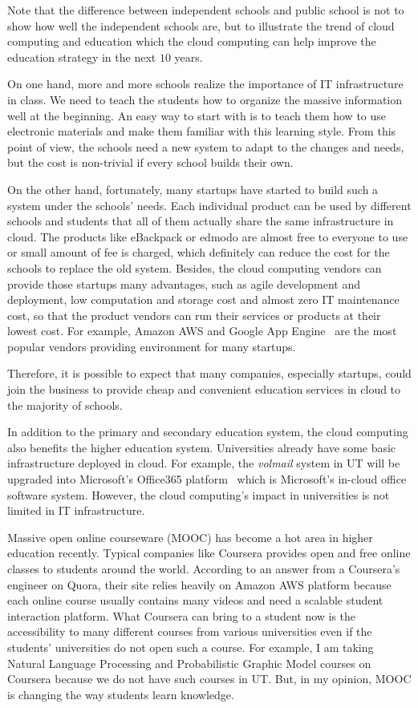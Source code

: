 Note that the difference between independent schools and public school is not to show how well the independent schools are, but to illustrate the trend of cloud computing and education which the cloud computing can help improve the education strategy in the next $10$ years.

On one hand, more and more schools realize the importance of IT infrastructure in class. We need to teach the students how to organize the massive information well at the beginning. An easy way to start with is to teach them how to use electronic materials and make them familiar with this learning style. From this point of view, the schools need a new system to adapt to the changes and needs, but the cost is non-trivial if every school builds their own. 

On the other hand, fortunately, many startups have started to build such a system under the schools' needs. Each individual product can be used by different schools and students that all of them actually share the same infrastructure in cloud. The products like eBackpack or edmodo are almost free to everyone to use or small amount of fee is charged, which definitely can reduce the cost for the schools to replace the old system. Besides, the cloud computing vendors can provide those startups many advantages, such as agile development and deployment, low computation and storage cost and almost zero IT maintenance cost, so that the product vendors can run their services or products at their lowest cost. For example, Amazon AWS and Google App Engine~\cite{gae} are the most popular vendors providing environment for many startups.

Therefore, it is possible to expect that many companies, especially startups, could join the business to provide cheap and convenient education services in cloud to the majority of schools.

In addition to the primary and secondary education system, the cloud computing also benefits the higher education system. Universities already have some basic infrastructure deployed in cloud. For example, the \emph{volmail} system in UT will be upgraded into Microsoft's Office365 platform~\cite{office365} which is Microsoft's in-cloud office software system. However, the cloud computing's impact in universities is not limited in IT infrastructure.

Massive open online courseware (MOOC) has become a hot area in higher education recently. Typical companies like Coursera provides open and free online classes to students around the world. According to an answer from a Coursera's engineer on Quora\cite{quora2coursera}, their site relies heavily on Amazon AWS platform because each online course usually contains many videos and need a scalable student interaction platform. What Coursera can bring to a student now is the accessibility to many different courses from various universities even if the students' universities do not open such a course. For example, I am taking Natural Language Processing and Probabilistic Graphic Model courses on Coursera because we do not have such courses in UT. But, in my opinion, MOOC is changing the way students learn knowledge. 

